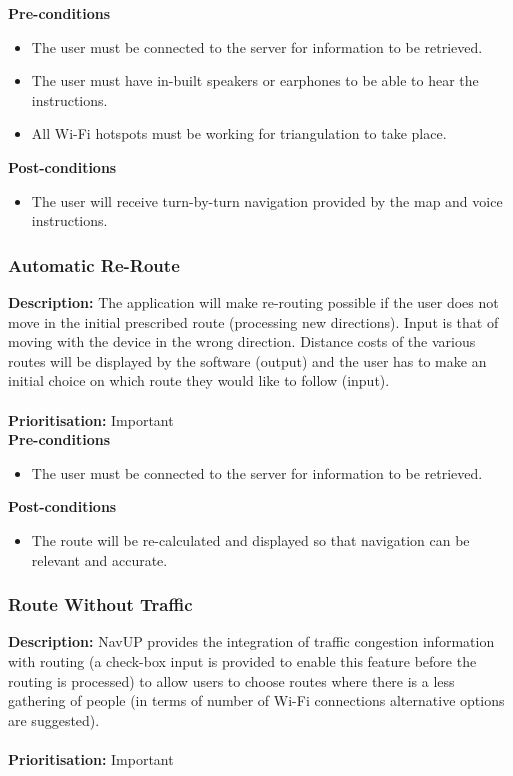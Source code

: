 \documentclass[runningheads,a4paper]{article}
\begin{document}
  
\textbf{Pre-conditions}
\begin{itemize}
	\item The user must be connected to the server for information to be retrieved.
	\item The user must have in-built speakers or earphones to be able to hear the instructions.
	\item All Wi-Fi hotspots must be working for triangulation to take place.
\end{itemize}
  
\textbf{Post-conditions}
\begin{itemize}
  	\item The user will receive turn-by-turn navigation provided by the map and voice instructions.
\end{itemize}

\subsubsection{Automatic Re-Route}

\textbf{Description:}  The application will make re-routing possible if the user does not move in the initial prescribed route (processing new directions). Input is that of moving with the device in the wrong direction. Distance costs of the various routes will be displayed by the software (output) and the user has to make an initial choice on which route they would like to follow (input).\\\\
\noindent
\textbf{Prioritisation:} Important\\
  
  
\textbf{Pre-conditions}
\begin{itemize}
	\item The user must be connected to the server for information to be retrieved.
\end{itemize}
  
\textbf{Post-conditions}
\begin{itemize}
  	\item The route will be re-calculated and displayed so that navigation can be relevant and accurate.
\end{itemize}

\subsubsection{Route Without Traffic}

\textbf{Description:}  NavUP provides the integration of traffic congestion information with routing (a check-box input is provided to enable this feature before the routing is processed) to allow users to choose routes where there is a less gathering of people (in terms of number of Wi-Fi connections alternative options are suggested).\\\\
\noindent
\textbf{Prioritisation:} Important\\
  
\end{document}
